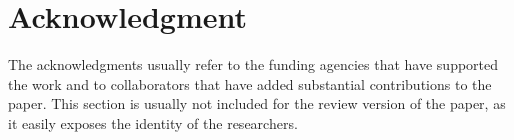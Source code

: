 \section*{Acknowledgment}

The acknowledgments usually refer to the funding agencies that have supported the work and to collaborators that have added substantial contributions to the paper.
This section is usually not included for the review version of the paper, as it easily exposes the identity of the researchers.

